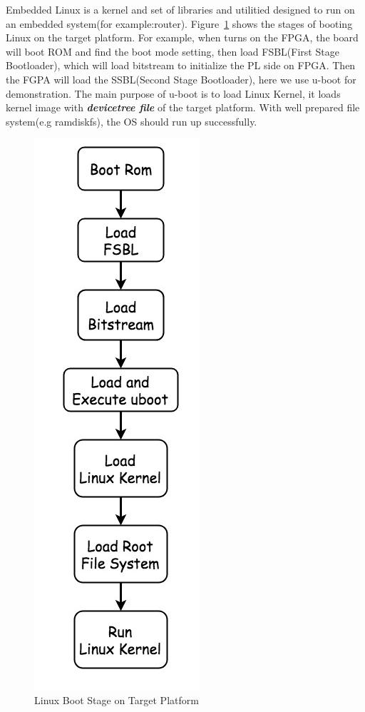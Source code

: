 Embedded Linux is a kernel and set of libraries and utilitied designed to run
on an embedded system(for example:router). Figure~\ref{fig:Linux Boot Stage on Target Platform} shows the stages of booting Linux on the target platform. For example, when turns on the FPGA, the board will boot ROM and find the boot mode setting, then load FSBL(First Stage Bootloader), which will load bitstream to initialize the PL side on FPGA. Then the FGPA will load the SSBL(Second Stage Bootloader), here we use u-boot for demonstration. The main purpose of u-boot is to load Linux Kernel, it loads kernel image with \textbf{\emph{devicetree file}} of the target platform. With well prepared file system(e.g ramdiskfs), the OS should run up successfully.
\begin{figure}[!htb]
  \centering
  \includegraphics[scale=0.4]{images/linux_boot_stage.jpg}
  \caption[Linux Boot Stage on Target Platform]{Linux Boot Stage on Target Platform}
  \label{fig:Linux Boot Stage on Target Platform}
\end{figure}



